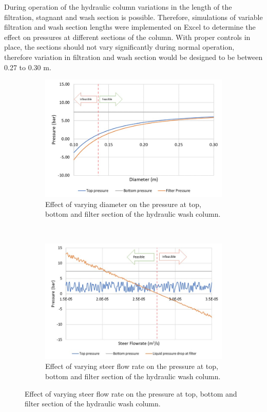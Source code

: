 During operation of the hydraulic column  variations in the length of the filtration, stagnant and wash section is possible. Therefore, simulations of variable filtration and wash section lengths were implemented on Excel to determine the effect on pressures at different sections of the column. With proper controls in place, the sections should not vary significantly during normal operation, therefore variation in filtration and wash section would be designed to be between 0.27 to 0.30 m.  

\begin{figure}[t!]
    \centering
    \begin{subfigure}[t]{0.5\textwidth}
        \centering
        \includegraphics[width=\linewidth]{chapters/3-separation/figures/diameter.jpg}
        \caption{Effect of varying diameter on the pressure at top, bottom and filter section of the hydraulic wash column.}
    \end{subfigure}%
    \label{fig:dia_col}
    ~ 
    \begin{subfigure}[t]{0.5\textwidth}
        \centering
        \includegraphics[width=\linewidth]{chapters/3-separation/figures/steerflow.jpg}
        \caption{Effect of varying steer flow rate on the pressure at top, bottom and filter section of the hydraulic wash column.}
    \end{subfigure}
    \label{fig:steer}
\end{figure}


